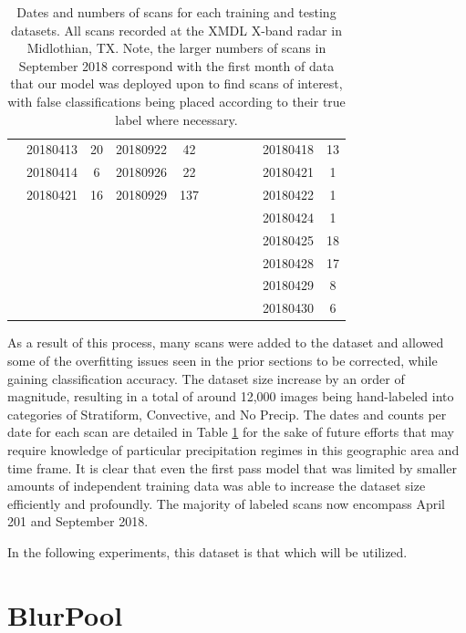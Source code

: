 \begin{table}[ht]
\begin{adjustbox}{width=\columnwidth,center}
\begin{tabular}{c|cccc|cccc|cc}
		& 20180413 & 20 & 20180922 & 42 & & & & & 20180418 & 13 \\
		& 20180414 & 6 & 20180926 & 22 & & & & & 20180421 & 1 \\
		& 20180421 & 16 & 20180929 & 137 & & & & & 20180422 & 1 \\
		& & & & & & & & & 20180424 & 1 \\
		& & & & & & & & & 20180425 & 18 \\
		& & & & & & & & & 20180428 & 17 \\
		& & & & & & & & & 20180429 & 8 \\
		& & & & & & & & & 20180430 & 6 \\ 
	\end{tabular} 
	\end{adjustbox}
	\caption{Dates and numbers of scans for each training and testing datasets. All scans recorded at the XMDL X-band radar in Midlothian, TX. Note, the larger numbers of scans in September 2018 correspond with the first month of data that our model was deployed upon to find scans of interest, with false classifications being placed according to their true label where necessary.}
	\label{table:bestmodel_data_details}
\end{table}

As a result of this process, many scans were added to the dataset and allowed some of the overfitting issues seen in the prior sections to be corrected, while gaining classification accuracy.
The dataset size increase by an order of magnitude, resulting in a total of around 12,000 images being hand-labeled into categories of Stratiform, Convective, and No Precip.
The dates and counts per date for each scan are detailed in Table \ref{table:bestmodel_data_details} for the sake of future efforts that may require knowledge of particular precipitation regimes in this geographic area and time frame.
It is clear that even the first pass model that was limited by smaller amounts of independent training data was able to increase the dataset size efficiently and profoundly.
The majority of labeled scans now encompass April 201 and September 2018.

In the following experiments, this dataset is that which will be utilized.



\section{BlurPool}
\label{sec:bestmodel_blurpool}


